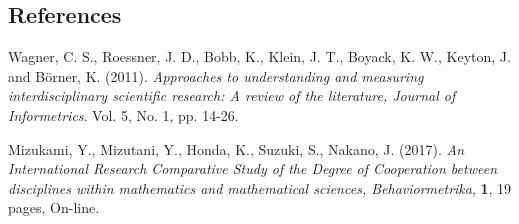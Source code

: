 \documentclass[12pt]{article}
\begin{document}
%        
%
%        

\subsection*{References}

\begin{description}

\item
Wagner, C. S., Roessner, J. D., Bobb, K., Klein, J. T., Boyack, K. W., Keyton, J. and Börner, K. (2011).
\textit{Approaches to understanding and measuring interdisciplinary scientific research: A review of the literature, Journal of Informetrics}. Vol. 5, No. 1, pp. 14-26.

\item
Mizukami, Y., Mizutani, Y., Honda, K., Suzuki, S., Nakano, J. (2017).
\textit{An International Research Comparative Study of the Degree of Cooperation between disciplines within mathematics and mathematical sciences, Behaviormetrika},
\textbf{1}, 19 pages, On-line.

\end{description}
\end{document}
